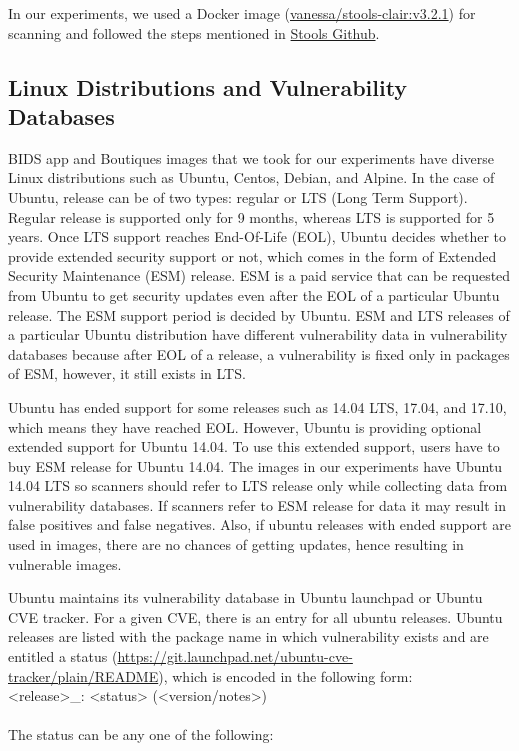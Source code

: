 \documentclass[a4paper,num-refs]{oup-contemporary}
\begin{document}
In our experiments, we used a Docker image (\href{https://hub.docker.com/r/vanessa/stools-clair}{vanessa/stools-clair:v3.2.1})
for scanning and followed the steps mentioned in \href{https://github.com/singularityhub/stools}{Stools Github}.

\subsection{Linux Distributions and Vulnerability Databases}

BIDS app and Boutiques images that we took for our experiments have diverse Linux
distributions such as Ubuntu, Centos, Debian, and Alpine. In the case of Ubuntu, release
can be of two types: regular or LTS (Long Term Support).
Regular release is supported only for 9 months, whereas LTS is supported for 5 years. Once LTS support
reaches End-Of-Life (EOL), Ubuntu decides whether to provide extended security support or not, which comes
in the form of Extended Security Maintenance (ESM) release.
ESM is a paid service that can be requested from Ubuntu to get security 
updates even after the EOL of a particular Ubuntu release. The ESM support period is decided by
Ubuntu. ESM and LTS releases of a particular Ubuntu distribution have different vulnerability
data in vulnerability databases because after EOL of a release, a vulnerability is fixed only in packages of ESM, however, it still
exists in LTS.

Ubuntu has ended support for some releases such as 14.04 LTS,
17.04, and 17.10, which means they have reached EOL. However, Ubuntu is providing optional extended support for Ubuntu 14.04.
To use this extended support, users have to buy ESM release for Ubuntu 14.04.
The images in our experiments have Ubuntu 14.04 LTS so scanners should refer
to LTS release only while collecting data from vulnerability databases. If scanners refer to ESM release for data it may result
in false positives and false negatives.
Also, if ubuntu releases with ended support are used in images, there are no chances of getting updates, hence
resulting in vulnerable images. 

Ubuntu maintains its vulnerability database in Ubuntu launchpad or Ubuntu CVE tracker. For a given CVE, there is an entry for all ubuntu releases.
Ubuntu releases are listed with the package name
in which vulnerability exists and are entitled a status
(\href{https://git.launchpad.net/ubuntu-cve-tracker/plain/README}{https://git.launchpad.net/ubuntu-cve-tracker/plain/README}), which is
encoded in the following form:
\newline \\
\noindent <release>\_<source-package>: <status> (<version/notes>) \\
\newline\\
The status can be any one of the following:
\end{document}
